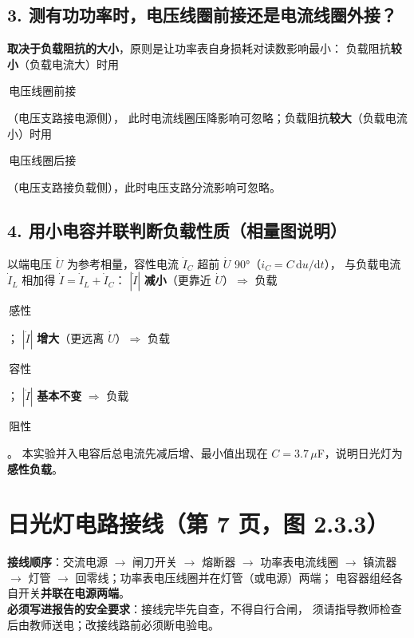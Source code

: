 \documentclass[UTF8,a4paper,10.5pt]{ctexart}
\newcommand{\key}[1]{\textbf{\color{acc}#1}}
\newcommand{\cw}[1]{\colorbox{soft}{\strut\,#1\,}}
\newcommand{\warn}[1]{\textcolor{warnc}{#1}}
\begin{document}
\subsection*{3. 测有功功率时，电压线圈前接还是电流线圈外接？}
\key{取决于负载阻抗的大小}，原则是让功率表自身损耗对读数影响最小：
负载阻抗\key{较小}（负载电流大）时用\cw{电压线圈前接}（电压支路接电源侧），
此时电流线圈压降影响可忽略；负载阻抗\key{较大}（负载电流小）时用\cw{电压线圈后接}
（电压支路接负载侧），此时电压支路分流影响可忽略。

\subsection*{4. 用小电容并联判断负载性质（相量图说明）}
以端电压 $\dot U$ 为参考相量，容性电流 $\dot I_C$ 超前 $\dot U$ 90°（$i_C=C\,\mathrm du/\mathrm dt$），
与负载电流 $\dot I_L$ 相加得 $\dot I=\dot I_L+\dot I_C$：
$|\dot I|$ \key{减小}（更靠近 $\dot U$）$\Rightarrow$ 负载\cw{感性}；
$|\dot I|$ \key{增大}（更远离 $\dot U$）$\Rightarrow$ 负载\cw{容性}；
$|\dot I|$ \key{基本不变} $\Rightarrow$ 负载\cw{阻性}。
本实验并入电容后总电流先减后增、最小值出现在 $C=3.7\,\mu$F，说明日光灯为\key{感性负载}。

\begin{center}
\end{center}

\section{日光灯电路接线（第 7 页，图 2.3.3）}
\textbf{接线顺序}：交流电源 $\to$ 闸刀开关 $\to$ 熔断器 $\to$ 功率表电流线圈 $\to$ 镇流器
$\to$ 灯管 $\to$ 回零线；功率表电压线圈并在灯管（或电源）两端；
电容器组经各自开关\key{并联在电源两端}。
\\[2pt]
\textbf{必须写进报告的安全要求}：接线完毕先自查，\warn{不得自行合闸}，
须请指导教师检查后由教师送电；改接线路前必须断电验电。
\end{document}
